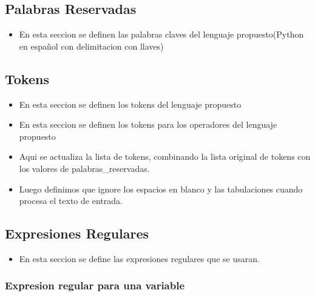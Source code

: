 \documentclass{article}
\begin{document}
\subsection{Palabras Reservadas}
\begin{itemize}
    \item En esta seccion se definen las palabras claves del lenguaje propuesto(Python en español con delimitacion con llaves)
\end{itemize}


\subsection{Tokens}
\begin{itemize}
    \item En esta seccion se definen los tokens del lenguaje propuesto
\end{itemize}

\begin{itemize}
    \item En esta seccion se definen los tokens para los operadores del lenguaje propuesto
\end{itemize}

\begin{itemize}
    \item Aqui se actualiza la lista de tokens, combinando la lista original de tokens con los valores de palabras\_reservadas.
    \item Luego definimos que ignore los espacios en blanco y las tabulaciones cuando procesa el texto de entrada.
\end{itemize}


\subsection{Expresiones Regulares}
\begin{itemize}
    \item En esta seccion se define las expresiones regulares que se usaran.
\end{itemize}
\subsubsection{Expresion regular para una variable}

\end{document}
